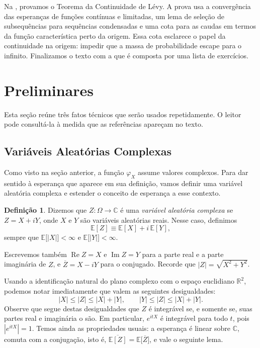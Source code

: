 \documentclass[12pt,portuguese]{article}
\theoremstyle{definition}
\newtheorem{definition}[definition]{Definição}
\theoremstyle{plainexercise}
\theoremstyle{starredexercise}
\theoremstyle{definition}
\begin{document}
Na , provamos o Teorema da Continuidade de Lévy.
A prova usa a convergência das esperanças de funções contínuas e limitadas,
um lema de seleção de subsequências para sequências condensadas e uma cota
para as caudas em termos da função característica perto da origem. Essa
cota esclarece o papel da continuidade na origem: impedir que a massa de
probabilidade escape para o infinito.
Finalizamos o texto com a  que é composta por uma lista de exercícios.

\section{Preliminares}\label{sec:preliminares}

Esta seção reúne três fatos técnicos que serão usados repetidamente. O leitor
pode consultá-la à medida que as referências apareçam no texto.

\subsection{Variáveis Aleatórias Complexas}\label{subsec:va-complexas}

Como visto na seção anterior, a função $\varphi_{X}$ assume valores complexos.
Para dar sentido à esperança que aparece em sua definição, vamos definir uma
variável aleatória complexa e estender o conceito de esperança a esse contexto.

\begin{definition}\label{def:va-complexa}
Dizemos que $Z:\Omega\to\mathbb{C}$ é uma \emph{variável aleatória complexa} se
$Z=X+iY$, onde $X$ e $Y$ são variáveis aleatórias reais. Nesse caso, definimos
\[
\mathbb{E}[Z] \equiv  \mathbb{E}[X]+i\,\mathbb{E}[Y],
\]
sempre que $\mathbb{E}\bigl[|X|\bigr]<\infty$ e $\mathbb{E}\bigl[|Y|\bigr]<\infty$.
\end{definition}

Escrevemos também $\operatorname{Re}Z=X$ e $\operatorname{Im}Z=Y$ para a parte
real e a parte imaginária de $Z$, e $\overline{Z}=X-iY$ para o conjugado.
Recorde que $|Z|=\sqrt{X^2+Y^2}$.

Usando a identificação natural do plano complexo com o espaço euclidiano $\mathbb{R}^2$,
podemos notar imediatamente que valem as seguintes desigualdades:
\[
|X|\leqslant |Z|\leqslant |X|+|Y|,
\qquad
|Y|\leqslant |Z|\leqslant |X|+|Y|.
\]
Observe que segue destas desigualdades que $Z$ é integrável se, e somente se, suas partes real e imaginária o
são. Em particular, $e^{itX}$ é integrável para todo $t$, pois
$|e^{itX}|=1$. Temos ainda as propriedades usuais: a esperança é
linear sobre $\mathbb{C}$, comuta com a conjugação, isto é,
$\overline{\mathbb{E}[Z]}=\mathbb{E}\bigl[\overline{Z}\bigr]$, e vale o seguinte lema.
\end{document}
